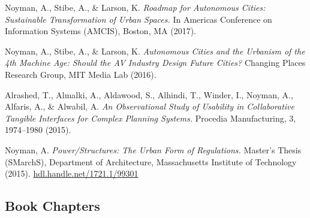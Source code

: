 \begin{tablist}
    \item[2017] \tab
    Noyman, A., Stibe, A., \& Larson, K.
    \textit{Roadmap for Autonomous Cities: Sustainable Transformation of Urban Spaces.}
    In Americas Conference on Information Systems (AMCIS), Boston, MA (2017).

    \item[2016] \tab
    Noyman, A., Stibe, A., \& Larson, K.
    \textit{Autonomous Cities and the Urbanism of the 4th Machine Age: Should the AV Industry Design Future Cities?}
    Changing Places Research Group, MIT Media Lab (2016).

    \item[2015] \tab
    Alrashed, T., Almalki, A., Aldawood, S., Alhindi, T., Winder, I., Noyman, A., Alfaris, A., \& Alwabil, A.
    \textit{An Observational Study of Usability in Collaborative Tangible Interfaces for Complex Planning Systems.}
    Procedia Manufacturing, 3, 1974--1980 (2015).

    \item[2015] \tab
    Noyman, A.
    \textit{Power/Structures: The Urban Form of Regulations.}
    Master's Thesis (SMarchS), Department of Architecture, Massachusetts Institute of Technology (2015).
    \href{https://hdl.handle.net/1721.1/99301}{hdl.handle.net/1721.1/99301}

\end{tablist}


\subsection*{Book Chapters}

